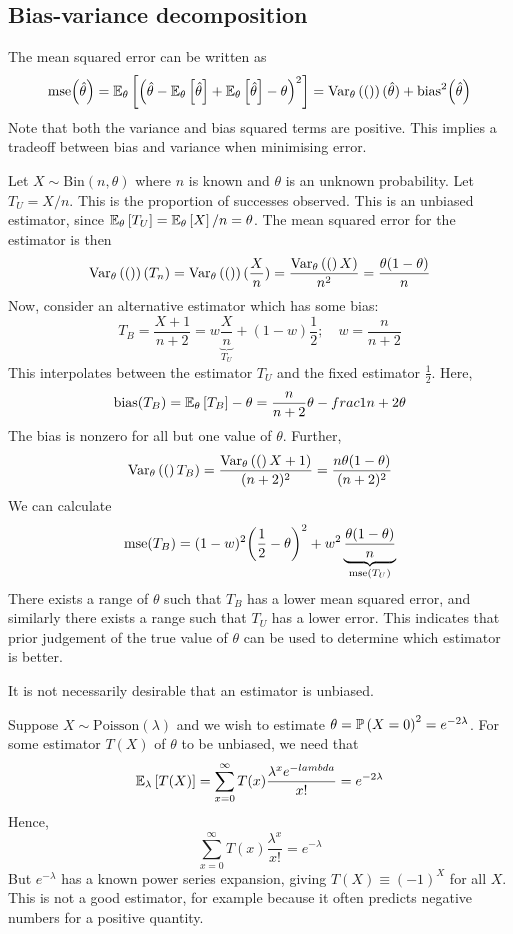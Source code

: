 \subsection{Bias-variance decomposition}
The mean squared error can be written as
\[ \mathrm{mse}\qty(\hat \theta) = \mathbb{E}_{\theta}\left[{\qty(\hat \theta - \mathbb{E}_{\theta}\left[{\hat\theta}\right] + \mathbb{E}_{\theta}\left[{\hat\theta}\right] - \theta)^2}\right] = \operatorname{Var}_{\theta}\left({\qty}\right)(\hat \theta) + \mathrm{bias}^2\qty(\hat\theta) \]
Note that both the variance and bias squared terms are positive.
This implies a tradeoff between bias and variance when minimising error.
\begin{example}
	Let \( X \sim \mathrm{Bin}(n, \theta) \) where \( n \) is known and \( \theta \) is an unknown probability.
	Let \( T_U = X / n \).
	This is the proportion of successes observed.
	This is an unbiased estimator, since \( \mathbb{E}_{\theta}\left[{T_U}\right] = \mathbb{E}_{\theta}\left[{X}\right]/n = \theta \).
	The mean squared error for the estimator is then
	\[ \operatorname{Var}_{\theta}\left({\qty}\right)(T_n) = \operatorname{Var}_{\theta}\left({\qty}\right)(\frac{X}{n}) = \frac{\operatorname{Var}_{\theta}\left({(}\right)X)}{n^2} = \frac{\theta(1-\theta)}{n} \]
	Now, consider an alternative estimator which has some bias:
	\[ T_B = \frac{X+1}{n+2} = w \underbrace{\frac{X}{n}}_{T_U} + (1-w)\frac{1}{2};\quad w = \frac{n}{n+2} \]
	This interpolates between the estimator \( T_U \) and the fixed estimator \( \frac{1}{2} \).
	Here,
	\[ \mathrm{bias}(T_B) = \mathbb{E}_{\theta}\left[{T_B}\right] - \theta = \frac{n}{n+2}\theta - frac{1}{n+2}\theta \]
	The bias is nonzero for all but one value of \( \theta \).
	Further,
	\[ \operatorname{Var}_{\theta}\left({(}\right)T_B) = \frac{\operatorname{Var}_{\theta}\left({(}\right)X+1)}{(n+2)^2} = \frac{n\theta(1-\theta)}{(n+2)^2} \]
	We can calculate
	\[ \mathrm{mse}\qty(T_B) = (1-w)^2 \qty(\frac{1}{2} - \theta)^2 + w^2\underbrace{\frac{\theta(1-\theta)}{n}}_{\mathrm{mse}(T_U)} \]
	There exists a range of \( \theta \) such that \( T_B \) has a lower mean squared error, and similarly there exists a range such that \( T_U \) has a lower error.
	This indicates that prior judgement of the true value of \( \theta \) can be used to determine which estimator is better.
\end{example}
It is not necessarily desirable that an estimator is unbiased.
\begin{example}
	Suppose \( X \sim \mathrm{Poisson}(\lambda) \) and we wish to estimate \( \theta = \mathbb{P}\left({X = 0}\right)^2 = e^{-2\lambda} \).
	For some estimator \( T(X) \) of \( \theta \) to be unbiased, we need that
	\[ \mathbb{E}_{\lambda}\left[{T(X)}\right] = \sum_{x=0}^\infty T(x) \frac{\lambda^x e^{-lambda}}{x!} = e^{-2\lambda} \]
	Hence,
	\[ \sum_{x=0}^\infty T(x) \frac{\lambda^x}{x!} = e^{-\lambda} \]
	But \( e^{-\lambda} \) has a known power series expansion, giving \( T(X) \equiv (-1)^X \) for all \( X \).
	This is not a good estimator, for example because it often predicts negative numbers for a positive quantity.
\end{example}

